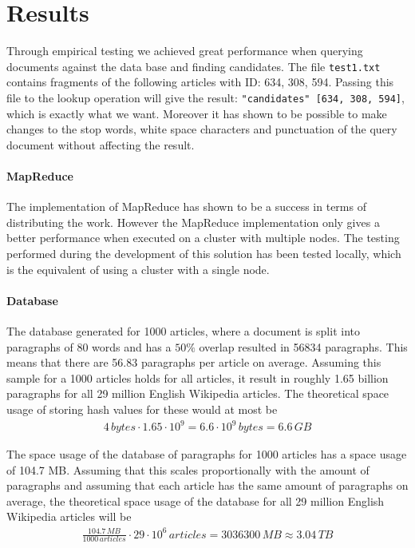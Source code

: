\section{Results}
Through empirical testing we achieved great performance when querying documents against the data base and finding candidates. The file \verb=test1.txt= contains fragments of the following articles with ID: 634, 308, 594. Passing this file to the lookup operation will give the result: \verb="candidates" [634, 308, 594]=, which is exactly what we want. Moreover it has shown to be possible to make changes to the stop words, white space characters and punctuation of the query document without affecting the result.

\paragraph{MapReduce}
The implementation of MapReduce has shown to be a success in terms of distributing the work. However the MapReduce implementation only gives a better performance when executed on a cluster with multiple nodes. The testing performed during the development of this solution has been tested locally, which is the equivalent of using a cluster with a single node.

\paragraph{Database}
The database generated for 1000 articles, where a document is split into paragraphs of 80 words and has a $50\%$ overlap resulted in 56834 paragraphs. This means that there are 56.83 paragraphs per article on average. Assuming this sample for a 1000 articles holds for all articles, it result in roughly 1.65 billion paragraphs for all 29 million English Wikipedia articles. The theoretical space usage of storing hash values for these would at most be
\begin{align*}
    4\, \textit{bytes} \cdot 1.65 \cdot 10^9 = 6.6 \cdot 10^9\, \textit{bytes} = 6.6\, \textit{GB}
\end{align*}

The space usage of the database of paragraphs for 1000 articles has a space usage of 104.7 MB. Assuming that this scales proportionally with the amount of paragraphs and assuming that each article has the same amount of paragraphs on average, the theoretical space usage of the database for all 29 million English Wikipedia articles will be
\begin{align*}
    \frac{104.7\, \textit{MB}}{1000\, \textit{articles}} \cdot 29 \cdot 10^6\, \textit{articles} = 3036300\, \textit{MB} \approx 3.04\, \textit{TB}
\end{align*}

